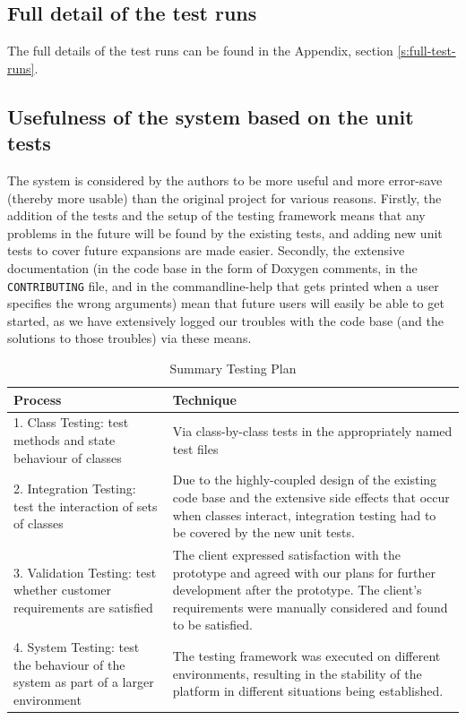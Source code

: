 \documentclass[11pt,a4paper]{article}
\begin{document}
\subsection{Full detail of the test runs}
The full details of the test runs can be found in the Appendix, section
\ref{s:full-test-runs}.


\subsection{Usefulness of the system based on the unit tests}
The system is considered by the authors to be more useful and more error-save
(thereby more usable) than the original project for various reasons. Firstly,
the addition of the tests and the setup of the testing framework means that any
problems in the future will be found by the existing tests, and adding new unit
tests to cover future expansions are made easier. Secondly, the extensive
documentation (in the code base in the form of Doxygen comments, in the
\texttt{CONTRIBUTING} file, and in the commandline-help that gets printed when
a user specifies the wrong arguments) mean that future users will easily be
able to get started, as we have extensively logged our troubles with the code
base (and the solutions to those troubles) via these means.

\begin{table}[h!]
    \centering
    \caption{Summary Testing Plan}
    \begin{tabular}[t]{|p{8cm}|p{7cm}|} \hline
        \textbf{Process} & \textbf{Technique} \\
        \hline 1. Class Testing: test methods and state behaviour of classes
                         & Via class-by-class tests in the appropriately named
                         test files\\
        \hline 2. Integration Testing: test the interaction of sets of classes
                            & Due to the highly-coupled design of the existing
                            code base and the extensive side effects that occur when
                            classes interact, integration testing had to be
                            covered by the new unit tests.\\
        \hline 3. Validation Testing: test whether customer requirements are
        satisfied
                            & The client expressed satisfaction with the
                            prototype and agreed with our plans for further
                            development after the prototype. The client's
                            requirements were manually considered and found to
                            be satisfied.\\
        \hline 4. System Testing: test the behaviour of the system as part of a
        larger environment
                            &  The testing framework was executed on different
                            environments, resulting in the stability of the
                            platform in different situations being established.\\
        \hline
    \end{tabular}
    \label{tab:test-plan}
\end{table}
\end{document}
